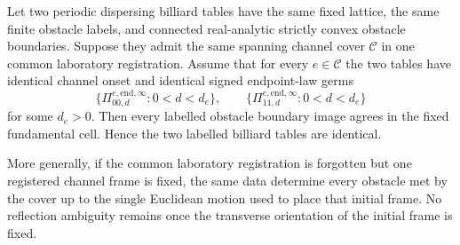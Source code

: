 \begin{theorem}
\label{thm:v22-multichannel-table-rigidity}
Let two periodic dispersing billiard tables have the same fixed lattice, the
same finite obstacle labels, and connected real-analytic strictly convex
obstacle boundaries.  Suppose they admit the same spanning channel cover
$\mathscr C$ in one common laboratory registration.  Assume that for every
$e\in\mathscr C$ the two tables have identical channel onset and identical
signed endpoint-law germs
\[
 \bigl\{\Pi^{e,\mathrm{end},\infty}_{00,d}:0<d<d_e\bigr\},
 \qquad
 \bigl\{\Pi^{e,\mathrm{end},\infty}_{11,d}:0<d<d_e\bigr\}
\]
for some $d_e>0$.  Then every labelled obstacle boundary image agrees in the
fixed fundamental cell.  Hence the two labelled billiard tables are
identical.

More generally, if the common laboratory registration is forgotten but one
registered channel frame is fixed, the same data determine every obstacle
met by the cover up to the single Euclidean motion used to place that initial
frame.  No reflection ambiguity remains once the transverse orientation of
the initial frame is fixed.
\end{theorem}

